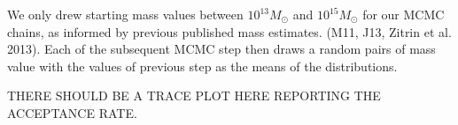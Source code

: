 We only drew starting mass values between
$10^{13} M_\odot$ and $10^{15} M_\odot$ for our MCMC
chains, as informed by previous published mass estimates. (M11, J13, Zitrin et al. 2013). Each of the subsequent MCMC step then
draws a random pairs of mass value with the values of
previous step as the means of the distributions. 

THERE SHOULD BE A TRACE PLOT HERE REPORTING THE ACCEPTANCE RATE.
 
